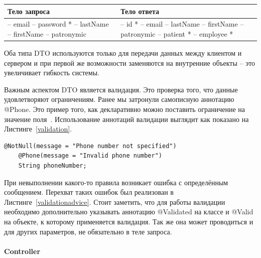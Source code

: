 \documentclass[a4paper,article]{article}
\begin{document}
\begin{sloppypar}
\begin{xltabular}{\textwidth} { |
        >{\hsize} X |
        >{\hsize} X | }
        \hline
        Тело запроса
        & Тело ответа \\

        \hline
        -- email \newline -- password * \newline -- lastName \newline -- firstName \newline -- patronymic
        & -- id * \newline -- email \newline -- lastName \newline -- firstName \newline -- patronymic \newline -- patient * \newline -- employee * \\

        \hline
    \end{xltabular}

    Оба типа DTO используются только для передачи данных между клиентом и сервером и при первой же возможности заменяются на внутренние объекты -- это увеличивает гибкость системы.

    Важным аспектом DTO является валидация. Это проверка того, что данные удовлетворяют ограничениям. Ранее мы затронули самописную аннотацию @Phone. Это пример того, как декларативно можно поставить ограничение на значение поля~\cite{baeldungbook}. Использование аннотаций валидации выглядит как показано на Листинге~\ref{validation}.

    \begin{lstlisting}[label=validation,caption=Пример валидации]
    @NotNull(message = "Phone number not specified")
    @Phone(message = "Invalid phone number")
    String phoneNumber;
    \end{lstlisting}

    При невыполнении какого-то правила возникает ошибка с определённым сообщением. Перехват таких ошибок был реализован в Листинге~\ref{validationadvice}. Стоит заметить, что для работы валидации необходимо дополнительно указывать аннотацию @Validated на классе и @Valid на объекте, к которому применяется валидация. Так же она может проводиться и для других параметров, не обязательно в теле запроса.

    \paragraph{Controller}\label{Реализация. Сервер. Controller}


\end{sloppypar}
\end{document}
